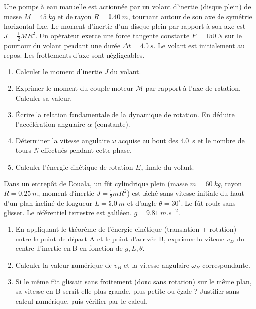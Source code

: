 \documentclass[11pt]{article}
\begin{document}
\begin{exercice}
Une pompe à eau manuelle est actionnée par un volant d'inertie (disque plein) de masse $M = \SI{45}{kg}$ et de rayon $R = \SI{0,40}{m}$, tournant autour de son axe de symétrie horizontal fixe. Le moment d'inertie d'un disque plein par rapport à son axe est $J = \frac{1}{2}MR^2$. Un opérateur exerce une force tangente constante $F = \SI{150}{N}$ sur le pourtour du volant pendant une durée $\Delta t = \SI{4,0}{s}$. Le volant est initialement au repos. Les frottements d'axe sont négligeables.
\begin{enumerate}
    \item Calculer le moment d'inertie $J$ du volant.
    \item Exprimer le moment du couple moteur $\mathcal{M}$ par rapport à l'axe de rotation. Calculer sa valeur.
    \item Écrire la relation fondamentale de la dynamique de rotation. En déduire l'accélération angulaire $\alpha$ (constante).
    \item Déterminer la vitesse angulaire $\omega$ acquise au bout des \SI{4,0}{s} et le nombre de tours $N$ effectués pendant cette phase.
    \item Calculer l'énergie cinétique de rotation $E_c$ finale du volant.
\end{enumerate}
\end{exercice}

\begin{exercice}
Dans un entrepôt de Douala, un fût cylindrique plein (masse $m = \SI{60}{kg}$, rayon $R = \SI{0,25}{m}$, moment d'inertie $J = \frac{1}{2}mR^2$) est lâché sans vitesse initiale du haut d'un plan incliné de longueur $L = \SI{5,0}{m}$ et d'angle $\theta = 30^\circ$. Le fût roule sans glisser. Le référentiel terrestre est galiléen. $g = \SI{9,81}{m.s^{-2}}$.
\begin{enumerate}
    \item En appliquant le théorème de l'énergie cinétique (translation + rotation) entre le point de départ A et le point d'arrivée B, exprimer la vitesse $v_B$ du centre d'inertie en B en fonction de $g, L, \theta$.
    \item Calculer la valeur numérique de $v_B$ et la vitesse angulaire $\omega_B$ correspondante.
    \item Si le même fût glissait sans frottement (donc sans rotation) sur le même plan, sa vitesse en B serait-elle plus grande, plus petite ou égale ? Justifier sans calcul numérique, puis vérifier par le calcul.
\end{enumerate}
\end{exercice}
\end{document}
